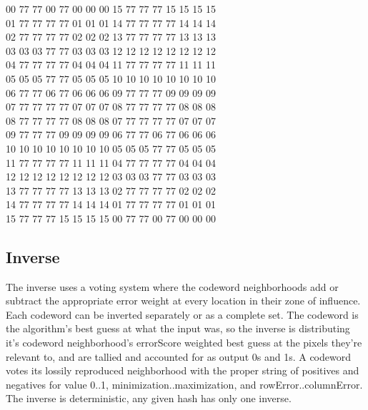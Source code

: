 \documentclass[11pt]{article}
\begin{document}
\begin{center}
00 77 77 00 77 00 00 00 15 77 77 77 15 15 15 15 \\
01 77 77 77 77 01 01 01 14 77 77 77 77 14 14 14 \\
02 77 77 77 77 02 02 02 13 77 77 77 77 13 13 13 \\
03 03 03 77 77 03 03 03 12 12 12 12 12 12 12 12 \\
04 77 77 77 77 04 04 04 11 77 77 77 77 11 11 11 \\
05 05 05 77 77 05 05 05 10 10 10 10 10 10 10 10 \\
06 77 77 06 77 06 06 06 09 77 77 77 09 09 09 09 \\
07 77 77 77 77 07 07 07 08 77 77 77 77 08 08 08 \\
08 77 77 77 77 08 08 08 07 77 77 77 77 07 07 07 \\
09 77 77 77 09 09 09 09 06 77 77 06 77 06 06 06 \\
10 10 10 10 10 10 10 10 05 05 05 77 77 05 05 05 \\
11 77 77 77 77 11 11 11 04 77 77 77 77 04 04 04 \\
12 12 12 12 12 12 12 12 03 03 03 77 77 03 03 03 \\
13 77 77 77 77 13 13 13 02 77 77 77 77 02 02 02 \\
14 77 77 77 77 14 14 14 01 77 77 77 77 01 01 01 \\
15 77 77 77 15 15 15 15 00 77 77 00 77 00 00 00 \\
\end{center}
\newpage
\subsection{Inverse}

The inverse uses a voting system where the codeword neighborhoods add or subtract the appropriate error weight at every location in their zone of influence. Each codeword can be inverted separately or as a complete set. The codeword is the algorithm's best guess at what the input was, so the inverse is distributing it's codeword neighborhood's errorScore weighted best guess at the pixels they're relevant to, and are tallied and accounted for as output 0s and 1s. A codeword votes its lossily reproduced neighborhood with the proper string of positives and negatives  for value 0..1, minimization..maximization, and rowError..columnError. The inverse is deterministic, any given hash has only one inverse.\\
\end{document}
